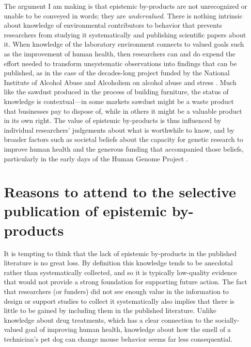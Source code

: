 \documentclass[twocolumn, serif, meta, authordate]{jote-article}
\begin{document}
The argument I am making is that epistemic by-products are not unrecognized or unable to be conveyed in words; they are \emph{undervalued}. There is nothing intrinsic about knowledge of environmental contributors to behavior that prevents researchers from studying it systematically and publishing scientific papers about it. When knowledge of the laboratory environment connects to valued goals such as the improvement of human health, then researchers can and do expend the effort needed to transform unsystematic observations into findings that can be published, as in the case of the decades-long project funded by the National Institute of Alcohol Abuse and Alcoholism on alcohol abuse and stress \parencite{Grant}. Much like the sawdust produced in the process of building furniture, the status of knowledge is contextual---in some markets sawdust might be a waste product that businesses pay to dispose of, while in others it might be a valuable product in its own right. The value of epistemic by-products is thus influenced by individual researchers' judgements about what is worthwhile to know, and by broader factors such as societal beliefs about the capacity for genetic research to improve human health and the generous funding that accompanied those beliefs, particularly in the early days of the Human Genome Project \parencite{Lippman1992}.

 {} \section*{Reasons to attend to the selective publication of epistemic by-products}

It is tempting to think that the lack of epistemic by-products in the published literature is no great loss. By definition this knowledge tends to be anecdotal rather than systematically collected, and so it is typically low-quality evidence that would not provide a strong foundation for supporting future action. The fact that researchers (or funders) did not see enough value in the information to design or support studies to collect it systematically also implies that there is little to be gained by including them in the published literature. Unlike knowledge about drug treatments, which has a clear connection to the socially-valued goal of improving human health, knowledge about how the smell of a technician's pet dog can change mouse behavior seems far less consequential.
\end{document}
